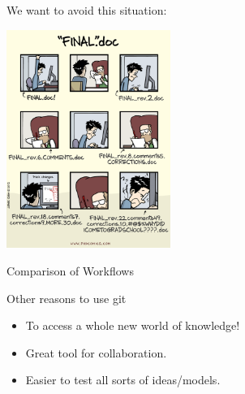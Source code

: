 \documentclass[ignorenonframetext,]{beamer}
\providecommand{\tightlist}{%
  \setlength{\itemsep}{0pt}\setlength{\parskip}{0pt}}
\begin{document}
\begin{frame}{We want to avoid this situation:}
\protect\hypertarget{we-want-to-avoid-this-situation}{}

\centering

\includegraphics[height=2.8in]{../Images/phdcomics.png}

\end{frame}

\begin{frame}{Comparison of Workflows}
\protect\hypertarget{comparison-of-workflows}{}


\end{frame}

\begin{frame}{Other reasons to use git}
\protect\hypertarget{other-reasons-to-use-git}{}

\begin{itemize}
\tightlist
\item
  To access a whole new world of knowledge!\\
\item
  Great tool for collaboration.\\
\item
  Easier to test all sorts of ideas/models.
\end{itemize}

\end{frame}
\end{document}
